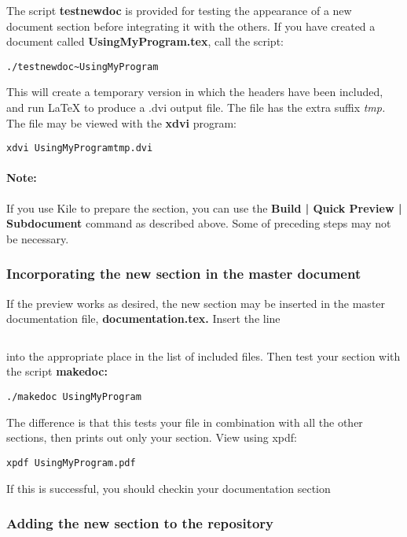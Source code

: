 The script \textbf{testnewdoc} is provided for testing the appearance
of a new document section before integrating it with the others. If you
have created a document called \textbf{UsingMyProgram.tex}, 
call the script:


\begin{verbatim}
./testnewdoc~UsingMyProgram
\end{verbatim}
This will create a temporary version in which the headers have been
included, and run \LaTeX{} to produce a .dvi output file. The file has the
extra suffix \textit{tmp.} The file may be viewed with the \textbf{xdvi} program:

\begin{verbatim}
xdvi UsingMyProgramtmp.dvi
\end{verbatim}

\paragraph{Note:} If you use Kile to prepare the section, you can use
the \textbf{Build | Quick Preview | Subdocument} command as described
above. Some of preceding steps may not be necessary.

\subsubsection{Incorporating the new section in the master document}
If the preview works as desired, the new section may be inserted in the master
documentation file, \textbf{documentation.tex.} Insert the line

\begin{verbatim}

\end{verbatim}
into the appropriate place in the list of included files. Then test
your section with the script \textbf{makedoc:}

\begin{verbatim}
./makedoc UsingMyProgram
\end{verbatim}
The difference is that this tests your file in combination with all
the other sections, then prints out only your section. View using
xpdf:

\begin{verbatim}
xpdf UsingMyProgram.pdf
\end{verbatim}
If this is successful, you should checkin your documentation section

\subsubsection{Adding the new section to the repository}

